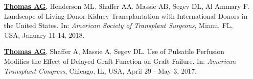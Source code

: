 \documentclass[10pt]{article}
\makeatletter
\newlength{\bibhang}
\newlength{\bibsep}
 {\@listi \global\bibsep\itemsep \global\advance\bibsep by\parsep}
\newenvironment{bibenum*}
  {\renewcommand\labelenumi{[\theenumi]}%
   \etaremune[
     topsep=0pt,
     itemsep=\bibsep,
     parsep=0pt,partopsep=0pt,
     itemindent=-\bibhang,
     leftmargin={\bibhang+\widthof{[999]}}]}
  {\endetaremune}
\makeatother
\begin{document}
\begin{bibenum*}

\item \underline{\textbf{Thomas AG}}, Henderson ML, Shaffer AA,
  Massie AB, Segev DL, Al Ammary F. Landscape of Living Donor Kidney
  Transplantation with International Donors in the United States.
  In: \emph{American Society of Transplant Surgeons},
  Miami, FL, USA, January 11-14, 2018.





\item \underline{\textbf{Thomas AG}}, Shaffer A, Massie A, Segev DL.
  Use of Pulsatile Perfusion Modifies the Effect of
  Delayed Graft Function on Graft Failure.
  In: \emph{American Transplant Congress},
  Chicago, IL, USA, April 29 - May 3, 2017.


\end{bibenum*}
\end{document}
